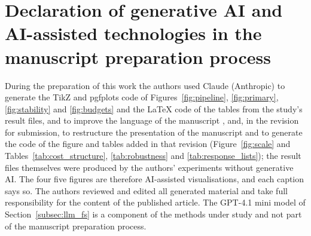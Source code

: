 \documentclass[final,5p,twocolumn]{elsarticle}
\providecommand{\DIFaddtex}[1]{{\protect\color{blue} \sf #1}} %
\providecommand{\DIFdeltex}[1]{{\protect\color{red} \scriptsize #1}} %
\providecommand{\DIFaddbegin}{} %
\providecommand{\DIFaddend}{} %
\providecommand{\DIFdelbegin}{} %
\providecommand{\DIFdelend}{} %
\providecommand{\DIFadd}[1]{\texorpdfstring{\DIFaddtex{#1}}{#1}} %
\providecommand{\DIFdel}[1]{\texorpdfstring{\DIFdeltex{#1}}{}} %
\begin{document}
\section*{Declaration of generative AI and AI-assisted technologies in the manuscript preparation process}
During the preparation of this work the authors used Claude (Anthropic) to generate the TikZ and pgfplots code of Figures~\ref{fig:pipeline}, \ref{fig:primary}, \ref{fig:stability} and \ref{fig:budgets} and the LaTeX code of the tables from the study's result files, \DIFdelbegin \DIFdel{and }\DIFdelend to improve the language of the manuscript\DIFaddbegin \DIFadd{, and, in the revision for submission, to restructure the presentation of the manuscript and to generate the code of the figure and tables added in that revision (Figure~\ref{fig:scale} and Tables~\ref{tab:cost_structure}, \ref{tab:robustness} and \ref{tab:response_lists})}\DIFaddend ; the result files themselves were produced by the authors' experiments without generative AI. The \DIFdelbegin \DIFdel{four }\DIFdelend \DIFaddbegin \DIFadd{five }\DIFaddend figures are therefore AI-assisted visualisations, and each caption says so. The authors reviewed and edited all generated material and take full responsibility for the content of the published article. The GPT-4.1 mini model of Section~\ref{subsec:llm_fs} is a component of the methods under study and not part of the manuscript preparation process.
\end{document}
